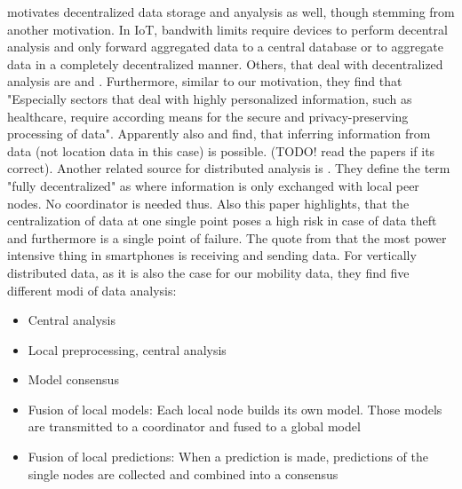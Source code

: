 \parencite{iot} motivates decentralized data storage and anyalysis as well, though stemming from another motivation. In IoT, bandwith limits require devices to perform decentral analysis and only forward aggregated data to a central database or to aggregate data in a completely decentralized manner. Others, that deal with decentralized analysis are \parencite{bin2010research} and \parencite{tsai2014data}. Furthermore, similar to our motivation, they find that "Especially sectors that deal with highly personalized information, such as healthcare, require according means for the secure and privacy-preserving processing of data". Apparently also \parencite{thrun2004advances} and \parencite{stolpe2011learning} find, that inferring information from data (not location data in this case) is possible. (TODO! read the papers if its correct). Another related source for distributed analysis is \parencite{das2010local}. They define the term "fully decentralized" as where information is only exchanged with local peer nodes. No coordinator is needed thus. Also this paper highlights, that the centralization of data at one single point poses a high risk in case of data theft and furthermore is a single point of failure. The quote from \parencite{carroll2010analysis} that the most power intensive thing in smartphones is receiving and sending data.
For vertically distributed data, as it is also the case for our mobility data, they find five different modi of data analysis:
\begin{itemize}
	\item Central analysis
	\item Local preprocessing, central analysis
	\item Model consensus
	\item Fusion of local models: Each local node builds its own model. Those models are transmitted to a coordinator and fused to a global model
	\item Fusion of local predictions: When a prediction is made, predictions of the single nodes are collected and combined into a consensus
\end{itemize}